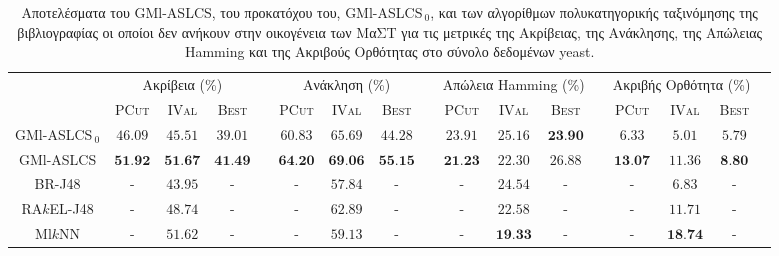 \begin{landscape}
\begin{table}
\begin{center}
\caption[Αποτελέσματα στο σύνολο δεδομένων yeast.]{Αποτελέσματα του GMl-ASLCS, του προκατόχου του, GMl-ASLCS$_{\:0}$, και των αλγορίθμων πολυκατηγορικής ταξινόμησης της βιβλιογραφίας οι οποίοι δεν ανήκουν στην οικογένεια των ΜαΣΤ για τις μετρικές της Ακρίβειας, της Ανάκλησης, της Απώλειας Hamming και της Ακριβούς Ορθότητας στο σύνολο δεδομένων yeast.}
\label{table:yeastEvals}
\begin{tabular}{ccccccccccccccccc}
 & \multicolumn{3}{c}{Ακρίβεια (\%)} & & \multicolumn{3}{c}{Ανάκληση (\%)} & & \multicolumn{3}{c}{Απώλεια Hamming (\%)} & & \multicolumn{3}{c}{Ακριβής Ορθότητα (\%)}
\\ 
\cline{2-4} \cline{6-8} \cline{10-12} \cline{14-16}
& \textsc{PCut} & \textsc{IVal} & \textsc{Best} & & \textsc{PCut} & \textsc{IVal} & \textsc{Best} & & \textsc{PCut} & \textsc{IVal} & \textsc{Best} & & \textsc{PCut} & \textsc{IVal} & \textsc{Best}\\ \hline
GMl-ASLCS$_{\:0}$ & $46.09$ & $45.51$ & $39.01$ & & $60.83$ & $65.69$ & $44.28$ & & $23.91$ & $25.16$ & $\textbf{23.90}$ & & $6.33$ & $5.01$ & $5.79$ \\ 
GMl-ASLCS 		  & $\textbf{51.92}$ & $\textbf{51.67}$ & $\textbf{41.49}$ & & $\textbf{64.20}$ & $\textbf{69.06}$ & $\textbf{55.15}$ & & $\textbf{21.23}$	& $22.30$ & $26.88$	& & $\textbf{13.07}$ & $11.36$	& $\textbf{8.80}$ \\
\hline
\hline
BR-J48 			  & - & $43.95$ & - & & - & $57.84$ & - & & -	& $24.54$ & -	& & - & $6.83$	& - \\
RA$k$EL-J48 	  & - & $48.74$ & - & & - & $62.89$ & - & & -	& $22.58$ & -	& & - & $11.71$	& - \\
Ml$k$NN 		  & - & $51.62$ & - & & - & $59.13$ & - & & -	& $\textbf{19.33}$ & -	& & - & $\textbf{18.74}$	& - \\
\hline

\end{tabular} 
\end{center}
\end{table}
\end{landscape}





